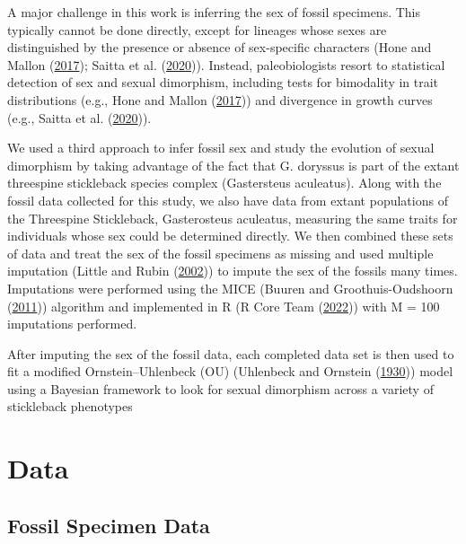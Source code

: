 \documentclass[
  12pt,
]{article}
\begin{document}
A major challenge in this work is inferring the sex of fossil specimens.
This typically cannot be done directly, except for lineages whose sexes
are distinguished by the presence or absence of sex-specific characters
(Hone and Mallon (\protect\hyperlink{ref-Hone2017}{2017}); Saitta et al.
(\protect\hyperlink{ref-SaittaEtAl2020}{2020})). Instead,
paleobiologists resort to statistical detection of sex and sexual
dimorphism, including tests for bimodality in trait distributions (e.g.,
Hone and Mallon (\protect\hyperlink{ref-Hone2017}{2017})) and divergence
in growth curves (e.g., Saitta et al.
(\protect\hyperlink{ref-SaittaEtAl2020}{2020})).

We used a third approach to infer fossil sex and study the evolution of
sexual dimorphism by taking advantage of the fact that G. doryssus is
part of the extant threespine stickleback species complex (Gastersteus
aculeatus). Along with the fossil data collected for this study, we also
have data from extant populations of the Threespine Stickleback,
Gasterosteus aculeatus, measuring the same traits for individuals whose
sex could be determined directly. We then combined these sets of data
and treat the sex of the fossil specimens as missing and used multiple
imputation (Little and Rubin
(\protect\hyperlink{ref-little2002statistical}{2002})) to impute the sex
of the fossils many times. Imputations were performed using the MICE
(Buuren and Groothuis-Oudshoorn (\protect\hyperlink{ref-MICE}{2011}))
algorithm and implemented in R (R Core Team
(\protect\hyperlink{ref-R2022language}{2022})) with M = 100 imputations
performed.

After imputing the sex of the fossil data, each completed data set is
then used to fit a modified Ornstein--Uhlenbeck (OU) (Uhlenbeck and
Ornstein (\protect\hyperlink{ref-OUProcess}{1930})) model using a
Bayesian framework to look for sexual dimorphism across a variety of
stickleback phenotypes

\hypertarget{sec:data}{%
\section{Data}\label{sec:data}}

\hypertarget{fossil-specimen-data}{%
\subsection{Fossil Specimen Data}\label{fossil-specimen-data}}
\end{document}
